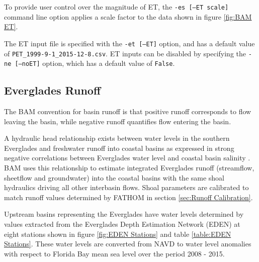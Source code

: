 To provide user control over the magnitude of ET, the \texttt{-es [--ET scale]} command line option applies a scale factor to the data shown in figure \ref{fig:BAM ET}. 

The ET input file is specified with the \texttt{-et [--ET]} option, and has a default value of \texttt{PET\_1999-9-1\_2015-12-8.csv}.  ET inputs can be disabled by specifying the \texttt{-ne [--noET]} option, which has a default value of \texttt{False}. 

\subsection{Everglades Runoff}
\label{sec:Input Data Runoff}
The BAM convention for basin runoff is that positive runoff corresponds to flow leaving the basin, while negative runoff quantifies flow entering the basin.  

A hydraulic head relationship exists between water levels in the southern Everglades and freshwater runoff into coastal basins as expressed in strong negative correlations between Everglades water level and coastal basin salinity \citep{Tabb1967, Kelble2007}.  BAM uses this relationship to estimate integrated Everglades runoff (streamflow, sheetflow and groundwater) into the coastal basins with the same shoal hydraulics driving all other interbasin flows.  Shoal parameters are calibrated to match runoff values determined by FATHOM \citep{Cosby2010} in section \ref{sec:Runoff Calibration}.

Upstream basins representing the Everglades have water levels determined by values extracted from the Everglades Depth Estimation Network (EDEN) at eight stations shown in figure \ref{fig:EDEN Stations} and table \ref{table:EDEN Stations}.  These water levels are converted from NAVD to water level anomalies with respect to Florida Bay mean sea level over the period 2008 - 2015. 

